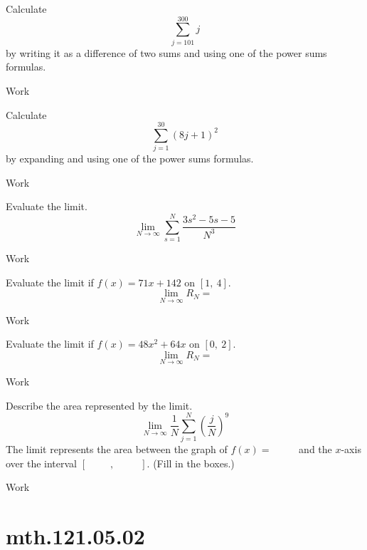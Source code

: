 \documentclass[12pt,addpoints, answers, fleqn]{exam}
\begin{document}
\begin{teacher}
\begin{questions}
\question 	%

Calculate
\[
\sum_{j=101}^{300} j
\]
by writing it as a difference of two sums and using one of the power sums formulas.
 \begin{solution}
Work
\end{solution}
 
\question 	%

Calculate 
\[
\sum_{j=1}^{30} \left( 8j + 1\right)^2
\]
by expanding and using one of the power sums formulas.
 \begin{solution}
Work
\end{solution}
 
\question 	%

Evaluate the limit.
\[
\lim_{N \to \infty} \sum_{s=1}^N \frac{3s^2-5s-5}{N^3}
\]
\begin{solution}
Work
\end{solution}
\question 	%

Evaluate the limit if $f\left(x\right) = 71x + 142$ on $\left[1, \ 4 \right]$.
\[
\lim_{N \to \infty} R_N =
\]
\begin{solution}
Work
\end{solution}
\question 	%

Evaluate the limit if $f\left(x\right) = 48x^2 + 64x$ on $\left[0, \ 2 \right]$.
\[
\lim_{N \to \infty} R_N =
\]
\question 	%
\begin{solution}
Work
\end{solution}
Describe the area represented by the limit.
\[
\lim_{N \to \infty} \frac{1}{N} \sum_{j=1}^N \left( \frac{j}{N} \right)^9
\]
The limit represents the area between the graph of $f\left(x\right) = \boxed{\phantom{\sin x}}$ and the $x$-axis over the interval $\left[\boxed{\phantom{\sin x}}, \ \boxed{\phantom{\sin x}}  \right]$. (Fill in the boxes.)
\begin{solution}
Work
\end{solution}
\end{questions}
\end{teacher}
\vfill
\pagebreak


\section{mth.121.05.02}
\end{document}
